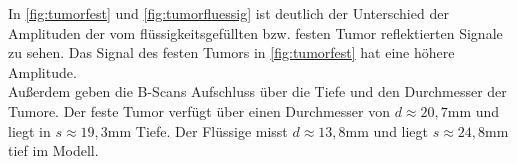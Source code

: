 In \autoref{fig:tumorfest} und \autoref{fig:tumorfluessig} ist deutlich der Unterschied 
der Amplituden der vom flüssigkeitsgefüllten bzw. festen Tumor reflektierten Signale zu sehen.
Das Signal des festen Tumors in \autoref{fig:tumorfest} hat eine höhere 
Amplitude. \\
Außerdem geben die B-Scans Aufschluss über die Tiefe und den Durchmesser der Tumore.
Der feste Tumor verfügt über einen Durchmesser von $d \approx 20,7$mm und liegt in $s \approx 19,3$mm Tiefe.
Der Flüssige misst $d \approx 13,8$mm und liegt $s \approx  24,8$mm tief im Modell.

